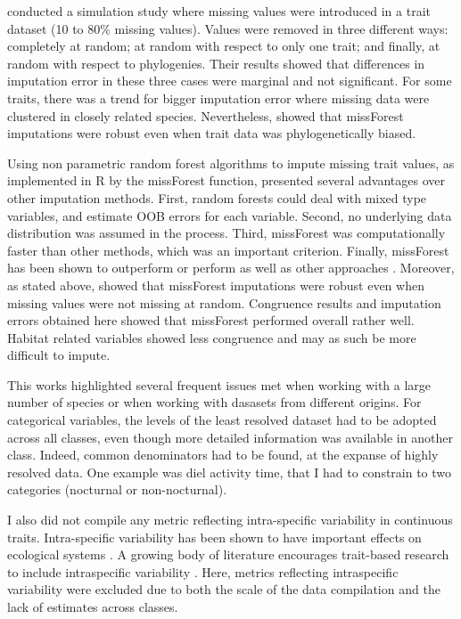 \citet{Penone2014} conducted a simulation study where missing values were introduced in a trait dataset (10 to 80\% missing values). Values were removed in three different ways: completely at random; at random with respect to only one trait; and finally, at random with respect to phylogenies. Their results showed that differences in imputation error in these three cases were marginal and not significant. For some traits, there was a trend for bigger imputation error where missing data were clustered in closely related species.  Nevertheless, \citet{Penone2014} showed that missForest imputations were robust even when trait data was phylogenetically biased.  

Using non parametric random forest algorithms to impute missing trait values, as implemented in R by the missForest function, presented several advantages over other imputation methods. First, random forests could deal with mixed type variables, and estimate OOB errors for each variable. Second, no underlying data distribution was assumed in the process. Third, missForest was computationally faster than other methods, which was an important criterion. Finally, missForest has been shown to outperform or perform as well as other approaches \citep{Stekhoven2012, Penone2014}. Moreover, as stated above, \citet{Penone2014} showed that missForest imputations were robust even when  missing values were not missing at random. Congruence results and imputation errors obtained here showed that missForest performed overall rather well. Habitat related variables showed less congruence and may as such be more difficult to impute.

This works highlighted several frequent issues met when working with a large number of species or when working with dasasets from different origins. For categorical variables, the levels of the least resolved dataset had to be adopted across all classes, even though more detailed information was available in another class. Indeed, common denominators had to be found, at the expanse of highly resolved data. One example was diel activity time, that I had to constrain to two categories (nocturnal or non-nocturnal).

I also did not compile any metric reflecting intra-specific variability in continuous traits. Intra-specific variability has been shown to have important effects on ecological systems \citep{DesRoches2018, Bolnick2011, Gonzalez-Suarez2013a}. A growing body of literature encourages trait-based research to include intraspecific variability \citep{Carmona2016, Violle2012}. Here, metrics reflecting intraspecific variability were excluded due to both the scale of the data compilation and the lack of estimates across classes.

